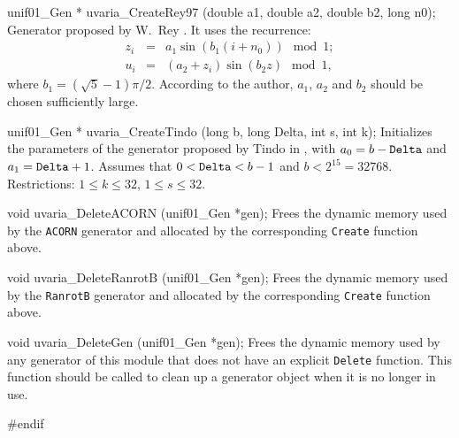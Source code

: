 unif01_Gen * uvaria_CreateRey97 (double a1, double a2, double b2, long n0);
\endcode
  \tab Generator proposed by W.\ Rey \cite{rREY98a}.
%
   It uses the recurrence:
   \begin {eqnarray}
    z_i &=& a_1 \sin (b_1 (i+n_0)) \mod 1;\\
    u_i &=& (a_2 + z_i) \sin (b_2 z) \mod 1,
   \end {eqnarray}
   where $b_1 = (\sqrt{5}-1) \pi/2$.
   According to the author, $a_1$, $a_2$ and $b_2$  should be chosen
   sufficiently large.
  \endtab
\code


unif01_Gen * uvaria_CreateTindo (long b, long Delta, int s, int k);
\endcode
  \tab  Initializes the parameters of the generator proposed
%
   by Tindo in \cite{rTIN90a}, with $a_0 = b - {\tt Delta}$  and
   $a_1 = {\tt Delta} + 1$.  Assumes that  $0 < {\tt Delta} < b-1$ and
   $b < 2^{15} = 32768$.
   Restrictions: $1 \le k \le 32$, $1 \le s \le 32$.
  \endtab


\code

void uvaria_DeleteACORN (unif01_Gen *gen);
\endcode
 \tab  Frees the dynamic memory used by the {\tt ACORN}
  generator and allocated by the corresponding {\tt Create} function
  above.
 \endtab
\code


void uvaria_DeleteRanrotB (unif01_Gen *gen);
\endcode
 \tab  Frees the dynamic memory used by the {\tt RanrotB}
  generator and allocated by the corresponding {\tt Create} function
  above.
 \endtab
\code


void uvaria_DeleteGen (unif01_Gen *gen);
\endcode
 \tab  Frees the dynamic memory used by any generator of this module
  that does not have an explicit {\tt Delete} function.
  This function should be called to clean up a generator object
  when it is no longer in use.
 \endtab

\code
\hide
#endif
\endhide
\endcode
